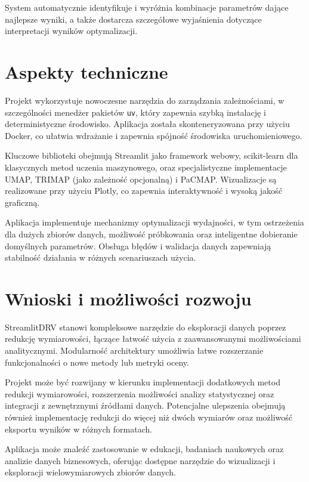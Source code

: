 \documentclass[a4paper, 12pt]{article}
\begin{document}
System automatycznie identyfikuje i wyróżnia kombinacje parametrów dające najlepsze wyniki, a także dostarcza szczegółowe wyjaśnienia dotyczące interpretacji wyników optymalizacji.

\section{Aspekty techniczne}

Projekt wykorzystuje nowoczesne narzędzia do zarządzania zależnościami, w szczególności menedżer pakietów \texttt{uv}, który zapewnia szybką instalację i deterministyczne środowisko. Aplikacja została skonteneryzowana przy użyciu Docker, co ułatwia wdrażanie i zapewnia spójność środowiska uruchomieniowego.

Kluczowe biblioteki obejmują Streamlit jako framework webowy, scikit-learn dla klasycznych metod uczenia maszynowego, oraz specjalistyczne implementacje UMAP, TRIMAP (jako zależność opcjonalną) i PaCMAP. Wizualizacje są realizowane przy użyciu Plotly, co zapewnia interaktywność i wysoką jakość graficzną.

Aplikacja implementuje mechanizmy optymalizacji wydajności, w tym ostrzeżenia dla dużych zbiorów danych, możliwość próbkowania oraz inteligentne dobieranie domyślnych parametrów. Obsługa błędów i walidacja danych zapewniają stabilność działania w różnych scenariuszach użycia.

\section{Wnioski i możliwości rozwoju}

StreamlitDRV stanowi kompleksowe narzędzie do eksploracji danych poprzez redukcję wymiarowości, łączące łatwość użycia z zaawansowanymi możliwościami analitycznymi. Modularność architektury umożliwia łatwe rozszerzanie funkcjonalności o nowe metody lub metryki oceny.

Projekt może być rozwijany w kierunku implementacji dodatkowych metod redukcji wymiarowości, rozszerzenia możliwości analizy statystycznej oraz integracji z zewnętrznymi źródłami danych. Potencjalne ulepszenia obejmują również implementację redukcji do więcej niż dwóch wymiarów oraz możliwość eksportu wyników w różnych formatach.

Aplikacja może znaleźć zastosowanie w edukacji, badaniach naukowych oraz analizie danych biznesowych, oferując dostępne narzędzie do wizualizacji i eksploracji wielowymiarowych zbiorów danych.
\end{document}
